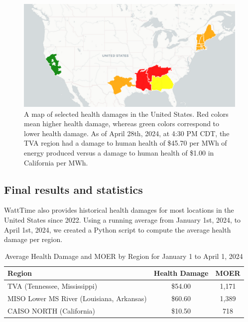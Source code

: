 \documentclass{article}
\begin{document}
\begin{figure}[h]
    \centering
    \includegraphics[width=\textwidth]{health-map.png}
    \caption{A map of selected health damages in the United States. Red colors mean higher health damage, whereas green colors correspond to
    lower health damage. As of April 28th, 2024, at 4:30 PM CDT, the TVA region had a damage to human health of \$45.70 per MWh of energy produced versus
    a damage to human health of \$1.00 in California per MWh.}
    \label{fig:grid5}
\end{figure}

\subsection{Final results and statistics}

WattTime also provides historical health damages for most locations in the United States since 2022. Using a running average from January 1st, 2024, to April 1st, 2024,
we created a Python script to compute the average health damage per region. 


\begin{table}[h]
    \centering
    \caption{Average Health Damage and MOER by Region for January 1 to April 1, 2024}
    \begin{tabular}{@{}lcc@{}}
    \toprule
    Region                                   & Health Damage  & MOER  \\ \midrule
    TVA (Tennessee, Mississippi)             & \$54.00                    & 1,171                     \\
    MISO Lower MS River (Louisiana, Arkansas) & \$60.60                    & 1,389                     \\
    CAISO NORTH (California)                 & \$10.50                    & 718                       \\ \bottomrule
    \end{tabular}
\end{table}
\end{document}
